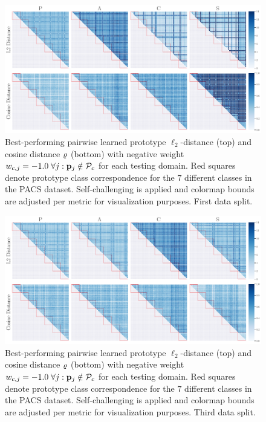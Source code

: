 \begin{figure}[ht]
    \centering
    \includegraphics[width=\textwidth]{Figures/Chapter4/2021-01-21-ProDropIncorrectWeight-1.0WithSCdrop_f0.5SAVEResNet18oracle_validation_trial0.pdf}
    \caption[First data split pairwise self-challenging prototype distances with $w_{c,j} = -1.0$] {Best-performing pairwise learned prototype $\ell_2$-distance (top) and cosine distance $\varrho$ (bottom) with negative weight $w_{c,j} = -1.0\; \forall j: \mathbf{p}_{j} \notin \mathcal{P}_c$ for each testing domain. Red squares denote prototype class correspondence for the $7$ different classes in the PACS dataset. Self-challenging is applied and colormap bounds are adjusted per metric for visualization purposes. First data split.}
    \label{fig:pairwise_distance_sc}
\end{figure}

\begin{figure}[ht]
    \centering
    \includegraphics[width=\textwidth]{Figures/Chapter4/2021-01-21-ProDropIncorrectWeight-1.0WithSCdrop_f0.5SAVEResNet18oracle_validation_trial2.pdf}
    \caption[Third data split pairwise self-challenging prototype distances with $w_{c,j} = -1.0$] {Best-performing pairwise learned prototype $\ell_2$-distance (top) and cosine distance $\varrho$ (bottom) with negative weight $w_{c,j} = -1.0\; \forall j: \mathbf{p}_{j} \notin \mathcal{P}_c$ for each testing domain. Red squares denote prototype class correspondence for the $7$ different classes in the PACS dataset. Self-challenging is applied and colormap bounds are adjusted per metric for visualization purposes. Third data split.}
\end{figure}


